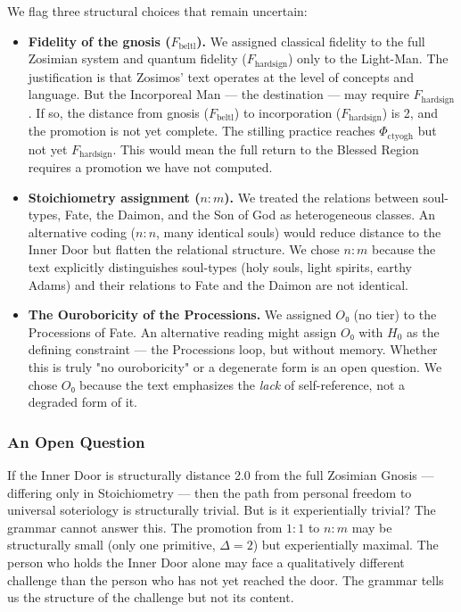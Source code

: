 \documentclass[12pt,a4paper]{article}
\begin{document}
We flag three structural choices that remain uncertain:

\begin{itemize}
    \item \textbf{Fidelity of the gnosis ($F_{\text{beltl}}$).} We assigned classical fidelity to the full Zosimian system and quantum fidelity ($F_{\text{hardsign}}$) only to the Light-Man. The justification is that Zosimos' text operates at the level of concepts and language. But the Incorporeal Man --- the destination --- may require $F_{\text{hardsign}}$. If so, the distance from gnosis ($F_{\text{beltl}}$) to incorporation ($F_{\text{hardsign}}$) is 2, and the promotion is not yet complete. The stilling practice reaches $\Phi_{\text{ctyogh}}$ but not yet $F_{\text{hardsign}}$. This would mean the full return to the Blessed Region requires a promotion we have not computed.
    \item \textbf{Stoichiometry assignment ($n:m$).} We treated the relations between soul-types, Fate, the Daimon, and the Son of God as heterogeneous classes. An alternative coding ($n:n$, many identical souls) would reduce distance to the Inner Door but flatten the relational structure. We chose $n:m$ because the text explicitly distinguishes soul-types (holy souls, light spirits, earthy Adams) and their relations to Fate and the Daimon are not identical.
    \item \textbf{The Ouroboricity of the Processions.} We assigned $O₀$ (no tier) to the Processions of Fate. An alternative reading might assign $O₀$ with $H_0$ as the defining constraint --- the Processions loop, but without memory. Whether this is truly "no ouroboricity" or a degenerate form is an open question. We chose $O₀$ because the text emphasizes the \emph{lack} of self-reference, not a degraded form of it.
\end{itemize}

\subsubsection{An Open Question}

If the Inner Door is structurally distance 2.0 from the full Zosimian Gnosis --- differing only in Stoichiometry --- then the path from personal freedom to universal soteriology is structurally trivial. But is it experientially trivial? The grammar cannot answer this. The promotion from $1:1$ to $n:m$ may be structurally small (only one primitive, $\Delta = 2$) but experientially maximal. The person who holds the Inner Door alone may face a qualitatively different challenge than the person who has not yet reached the door. The grammar tells us the structure of the challenge but not its content.
\end{document}
